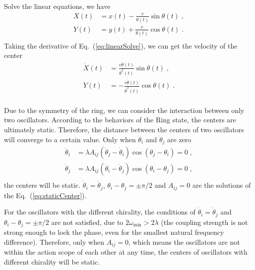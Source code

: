 \documentclass[%
 aip,
 amsmath,amssymb,
 reprint,%
]{revtex4-1}
\begin{document}
Solve the linear equations, we have
\begin{equation}\label{eq:linearSolve}
    \begin{aligned}
        X\left( t \right) &=x\left( t \right) -\frac{v}{\dot{\theta}\left( t \right)}\sin \theta \left( t \right)\;,\\
        Y\left( t \right) &=y\left( t \right) +\frac{v}{\dot{\theta}\left( t \right)}\cos \theta \left( t \right)\;.\\
    \end{aligned}
\end{equation}
Taking the derivative of Eq.~(\ref{eq:linearSolve}), we can get the velocity of the center
\begin{equation}
    \begin{aligned}
        \dot{X}\left( t \right) &=\frac{v\ddot{\theta}\left( t \right)}{\dot{\theta}^2\left( t \right)}\sin \theta \left( t \right)\;,\\
        \dot{Y}\left( t \right) &=-\frac{v\ddot{\theta}\left( t \right)}{\dot{\theta}^2\left( t \right)}\cos \theta \left( t \right)\;.\\
    \end{aligned}
\end{equation}

Due to the symmetry of the ring, we can consider the interaction between only two oscillators. 
According to the behaviors of the Ring state, the centers are ultimately static. Therefore, the distance between the centers of two oscillators will converge to a certain value. Only when $\ddot{\theta}_i$ and $\ddot{\theta}_j$ are zero
\begin{equation}\label{eq:staticCenter}
    \begin{aligned}
        \ddot{\theta}_i&=\lambda A_{ij}\left( \dot{\theta}_j-\dot{\theta}_i \right) \cos \left( \theta _j-\theta _i \right) =0\;,\\
        \ddot{\theta}_j&=\lambda A_{ij}\left( \dot{\theta}_i-\dot{\theta}_j \right) \cos \left( \theta _i-\theta _j \right) =0\;,\\
    \end{aligned}
\end{equation}
the centers will be static. $\dot{\theta}_i=\dot{\theta}_j$, $\theta _i-\theta _j=\pm\pi/2$ and $A_{ij}=0$ are the solutions of the Eq.~(\ref{eq:staticCenter}).

For the oscillators with the different chirality, the conditions of $\dot{\theta}_i=\dot{\theta}_j$ and $\theta _i-\theta _j=\pm\pi/2$ are not satisfied, due to $2\omega _{\min}>2\lambda $ (the coupling strength is not strong enough to lock the phase, even for the smallest natural frequency difference). Therefore, only when $A_{ij}=0$, which means the oscillators are not within the action scope of each other at any time, the centers of oscillators with different chirality will be static. 
\end{document}
